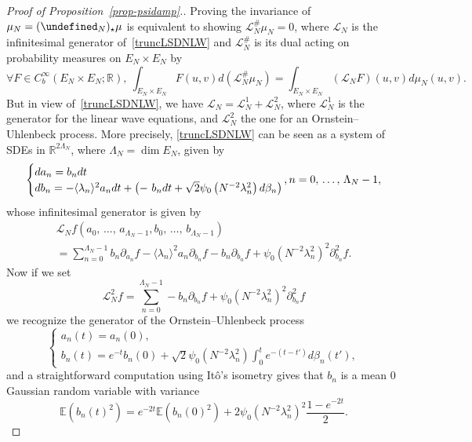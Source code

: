 \documentclass[AHL,Unicode,longabstracts,published]{cedram}
\newcommand{\R}{\mathbb{R}}
\newcommand{\E}{\mathbb{E}}
\let\P= \undefined
\newcommand{\P}{\mathbf{P}}
\renewcommand{\L}{\mathcal{L}}
\newcommand{\Ld}{\Lambda}
\newcommand{\jb}[1] {\langle #1 \rangle}
\let\oldforall\forall
\renewcommand*{\forall}{\mathrel{\oldforall}}
\begin{document}
\begin{proof}[Proof of Proposition~\ref{prop-psidamp}.]
Proving the invariance of $\mu_N=(\P_N)_{\star}\mu$ is equivalent to showing $\L_N^\#\mu_N=0$, where $\L_N$ is the infinitesimal generator of~\eqref{truncLSDNLW} and $\L_N^\#$ is its dual acting on probability measures on $E_N\times E_N$ by
\begin{equation*}
\forall F\in C^{\infty}_b(E_N\times E_N;\R),~\int_{E_N\times E_N}F(u,v)d(\L_N^\#\mu_N) = \int_{E_N\times E_N}(\L_NF)(u,v)d\mu_N(u,v).
\end{equation*}
But in view of~\eqref{truncLSDNLW}, we have $\L_N = \L_N^1+\L_N^2$, where $\L_N^1$ is the generator for the linear wave equations, and $\L_N^2$ the one for an Ornstein--Uhlenbeck process. More precisely, \eqref{truncLSDNLW} can be seen as a system of SDEs in $\R^{2\Ld_N}$, where $\Ld_N=\dim E_N$, given by
\begin{equation*}
\begin{cases}
d a_n = b_n dt\\
d b_n = -\jb{\lambda_n}^2a_ndt +\left(-\ b_ndt+\sqrt{2}\psi_0\left(N^{-2}\lambda_n^2\right)d\beta_n\right)
\end{cases}\mkern-20mu, n=0,\,\dots,\,\Ld_N-1,
\end{equation*}
whose infinitesimal generator is given by
\begin{multline*}
\L_Nf\left(a_0,\,\dots,\,a_{\Ld_N-1},b_0,\,\dots,\,b_{\Ld_N-1}\right)\\
= \sum_{n=0}^{\Ld_N-1}b_n\partial_{a_n}f-\jb{\lambda_n}^2a_n\partial_{b_n}f - b_n\partial_{b_n}f+\psi_0\left(N^{-2}\lambda_n^2\right)^2\partial_{b_n}^2f.
\end{multline*}
Now if we set
\begin{equation*}
\L_N^2f = \sum_{n=0}^{\Ld_N-1}-b_n\partial_{b_n}f+\psi_0\left(N^{-2}\lambda_n^2\right)^2\partial_{b_n}^2f
\end{equation*}
we recognize the generator of the Ornstein--Uhlenbeck process
\begin{equation*}
\begin{cases}
a_n(t)=a_n(0),\\
b_n(t)=e^{-t}b_n(0)+\sqrt{2}\psi_0\left(N^{-2}\lambda_n^2\right)\int_0^te^{-(t-t')}d\beta_n(t'),
\end{cases}
\end{equation*}
and a straightforward computation using It\^o's isometry gives that $b_n$ is a mean 0 Gaussian random variable with variance
\begin{equation*}
\E\left(b_n(t)^2\right)=e^{-2t}\E\left(b_n(0)^2\right)+2\psi_0\left(N^{-2}\lambda_n^2\right)^2\frac{1-e^{-2 t}}2.

\end{equation*}
\end{proof}
\end{document}
